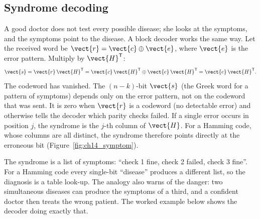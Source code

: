 \subsection{Syndrome decoding}

A good doctor does not test every possible disease; she looks at the symptoms, and the symptoms
point to the disease. A block decoder works the same way. Let the received word be
$\vect{r}=\vect{c}\oplus\vect{e}$, where $\vect{e}$ is the error pattern. Multiply by
$\vect{H}^{\mathsf T}$:
\begin{equation}
\vect{s}=\vect{r}\,\vect{H}^{\mathsf T}=\vect{c}\,\vect{H}^{\mathsf T}\oplus\vect{e}\,\vect{H}^{\mathsf T}
=\vect{e}\,\vect{H}^{\mathsf T}.
\label{eq:ch14:syndrome}
\end{equation}
The codeword has vanished. The $(n-k)$-bit  $\vect{s}$ (the Greek word for a
pattern of symptoms) depends only on the error pattern, not on the codeword that was sent. It is zero
when $\vect{r}$ is a codeword (no detectable error) and otherwise tells the decoder which parity checks
failed. If a single error occurs in position $j$, the syndrome is the $j$-th column of $\vect{H}$. For
a Hamming code, whose columns are all distinct, the syndrome therefore points directly at the
erroneous bit (Figure~\ref{fig:ch14_symptom}).


\begin{analogy}
The syndrome is a list of symptoms: ``check 1 fine, check 2 failed, check 3 fine''. For a Hamming
code every single-bit ``disease'' produces a different list, so the diagnosis is a table look-up.
The analogy also warns of the danger: two simultaneous diseases can produce the symptoms of a
third, and a confident doctor then treats the wrong patient. The worked example below shows the
decoder doing exactly that.
\end{analogy}

